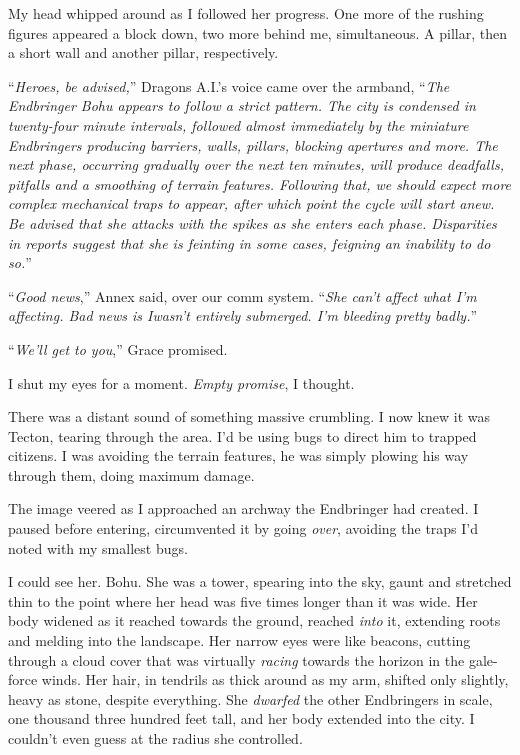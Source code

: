 My head whipped around as I followed her progress.  One more of the rushing figures appeared a block down, two more behind me, simultaneous.  A pillar, then a short wall and another pillar, respectively.



``\emph{Heroes, be advised,}'' Dragons A.I.'s voice came over the armband, ``\emph{The Endbringer Bohu appears to follow a strict pattern.  The city is condensed in twenty-four minute intervals, followed almost immediately by the miniature Endbringers producing barriers, walls, pillars, blocking apertures and more.  The next phase, occurring gradually over the next ten minutes, will produce deadfalls, pitfalls and a smoothing of terrain features.  Following that, we should expect more complex mechanical traps to appear, after which point the cycle will start anew.  Be advised that she attacks with the spikes as she enters each phase.  Disparities in reports suggest that she is feinting in some cases, feigning an inability to do so.}''



``\emph{Good news},'' Annex said, over our comm system.  ``\emph{She can't affect what I'm affecting.  Bad news is I}\emph{wasn't entirely submerged.  I'm bleeding pretty badly.}''



``\emph{We'll get to you},'' Grace promised.



I shut my eyes for a moment.  \emph{Empty promise}, I thought.



There was a distant sound of something massive crumbling.  I now knew it was Tecton, tearing through the area.  I'd be using bugs to direct him to trapped citizens.  I was avoiding the terrain features, he was simply plowing his way through them, doing maximum damage.



The image veered as I approached an archway the Endbringer had created.  I paused before entering, circumvented it by going \emph{over}, avoiding the traps I'd noted with my smallest bugs.



I could see her.  Bohu.  She was a tower, spearing into the sky, gaunt and stretched thin to the point where her head was five times longer than it was wide.  Her body widened as it reached towards the ground, reached \emph{into} it, extending roots and melding into the landscape.  Her narrow eyes were like beacons, cutting through a cloud cover that was virtually \emph{racing} towards the horizon in the gale-force winds.  Her hair, in tendrils as thick around as my arm, shifted only slightly, heavy as stone, despite everything.  She \emph{dwarfed} the other Endbringers in scale, one thousand three hundred feet tall, and her body extended into the city.  I couldn't even guess at the radius she controlled.



